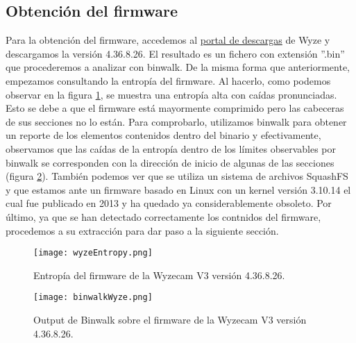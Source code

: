 \subsection{Obtención del firmware}
Para la obtención del firmware, accedemos al \href{https://support.wyze.com/hc/en-us/articles/360024852172-Release-Notes-Firmware}{portal de descargas}
de Wyze y descargamos la versión 4.36.8.26. El resultado es un fichero
con extensión ''.bin'' que procederemos a analizar con binwalk\cite{binwalk}. De la misma forma que anteriormente, empezamos consultando 
la entropía del firmware. Al hacerlo, como podemos observar en la figura \ref{fig:wyzeEntropy}, se muestra una entropía alta con caídas 
pronunciadas. Esto se debe a que el firmware está mayormente comprimido pero las cabeceras de sus secciones no lo están. Para comprobarlo,
utilizamos binwalk para obtener un reporte de los elementos contenidos dentro del binario y efectivamente, observamos que las caídas de 
la entropía dentro de los límites observables por binwalk se corresponden con la dirección de inicio de algunas de las secciones 
(figura \ref{fig:binwalkWyze}). También podemos ver que se utiliza un sistema de archivos SquashFS y que estamos ante un firmware basado
en Linux con un kernel versión 3.10.14 el cual fue publicado en 2013 y ha quedado ya considerablemente obsoleto. Por último, ya que se 
han detectado correctamente los contnidos del firmware, procedemos a su extracción para dar paso a la siguiente sección.

\begin{figure}[H]
    \centering
    \texttt{[image: wyzeEntropy.png]}
    \caption{Entropía del firmware de la Wyzecam V3 versión 4.36.8.26.}
    \label{fig:wyzeEntropy}
\end{figure}

\begin{figure}[H]
    \centering
    \texttt{[image: binwalkWyze.png]}
    \caption{Output de Binwalk sobre el firmware de la Wyzecam V3 versión 4.36.8.26.}
    \label{fig:binwalkWyze}
\end{figure}

